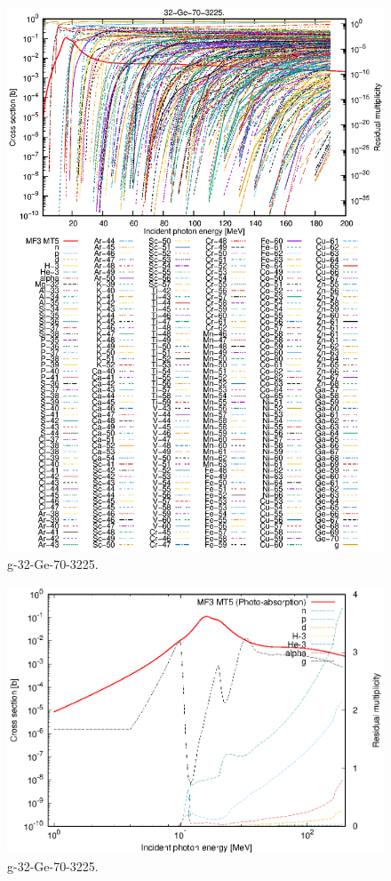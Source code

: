 \begin{figure}
 \includegraphics[width=\linewidth]{eps/g_32-Ge-70_3225.eps}
  \caption{g-32-Ge-70-3225.}
\end{figure}
\newpage \clearpage

\begin{figure}
 \includegraphics[width=\linewidth]{eps-log/g_32-Ge-70_3225.eps}
 \caption{g-32-Ge-70-3225.}
\end{figure}
\newpage \clearpage


